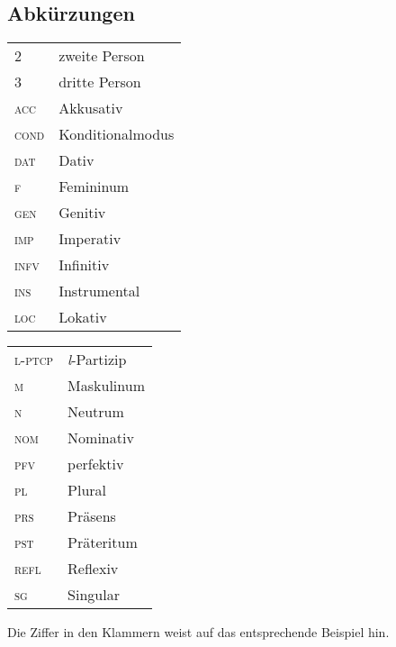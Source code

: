\documentclass[output=paper]{langscibook}
\begin{document}
\begin{otherlanguage}{german}
\section*{Abkürzungen}
\begin{tabularx}{.5\textwidth}{@{}lQ}
        \textsc{2}&zweite Person\\
         \textsc{3}&dritte Person\\
        \textsc{acc}&Akkusativ\\
        \textsc{cond}&Konditionalmodus\\
        \textsc{dat}&Dativ\\
        \textsc{f}&Femininum\\
       \textsc{gen}&Genitiv\\
        \textsc{imp}&Imperativ\\
        \textsc{infv}&Infinitiv\\
        \textsc{ins}&Instrumental\\
        \textsc{loc}&Lokativ\\
\end{tabularx}%
\begin{tabularx}{.5\textwidth}{@{}lX@{}}
        \textsc{l-ptcp}&\textit{l}-Partizip\\
        \textsc{m}&Maskulinum\\
        \textsc{n}&Neutrum\\
        \textsc{nom}&Nominativ\\
        \textsc{pfv}&perfektiv\\
        \textsc{pl}&Plural\\
        \textsc{prs}&Präsens\\
        \textsc{pst}&Präteritum\\
        \textsc{refl}&Reflexiv\\
        \textsc{sg}&Singular\\
\end{tabularx}

\nocite{Gorskij1966,Landa1966,Lenin-Gorkij-1969,nove-Knigi1967,Simonov1964,Slovar1957,Solncev1976,Zvegincev1976}

           {Die Ziffer in den Klammern weist auf das entsprechende Beispiel hin.}


\end{otherlanguage}
\end{document}
